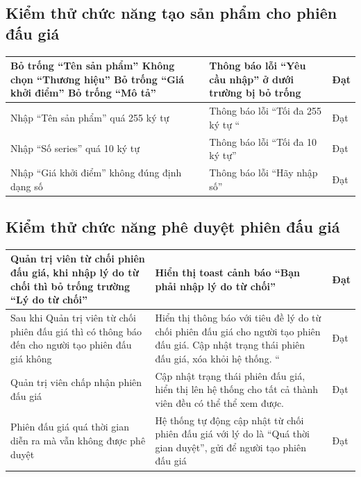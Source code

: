 \documentclass[../DoAn.tex]{subfiles}
\begin{document}
\subsection{Kiểm thử chức năng tạo sản phẩm cho phiên đấu giá}
    \tabletail{\hline}
    \label{bang414}
    \begin{supertabular}{| p{.45\textwidth}|p{.30\textwidth}|p{.15\textwidth}|} 
    \hline
        Bỏ trống “Tên sản phẩm”
        Không chọn “Thương hiệu”
        Bỏ trống “Giá khởi điểm”
        Bỏ trống “Mô tả”
        & Thông báo lỗi “Yêu cầu nhập” ở dưới trường bị bỏ trống&Đạt \\\hline
        Nhập “Tên sản phẩm” quá 255 ký tự
        & Thông báo lỗi “Tối đa 255 ký tự “&Đạt \\\hline
        Nhập “Số series” quá 10 ký tự
        & Thông báo lỗi “Tối đa 10 ký tự”&Đạt \\\hline
        Nhập “Giá khởi điểm” không đúng định dạng số
        & Thông báo lỗi “Hãy nhập số”&Đạt \\\hline
    \end{supertabular}
\subsection{Kiểm thử chức năng phê duyệt phiên đấu giá}
    \tabletail{\hline}
    \label{bang415}
    \begin{supertabular}{| p{.45\textwidth}|p{.30\textwidth}|p{.15\textwidth}|} 
    \hline
        Quản trị viên từ chối phiên đấu giá, khi nhập lý do từ chối thì bỏ trống trường “Lý do từ chối”
        & Hiển thị toast cảnh báo “Bạn phải nhập lý do từ chối”&Đạt \\\hline
        Sau khi Quản trị viên từ chối phiên đấu giá thì có thông báo đến cho người tạo phiên đấu giá không
        & Hiển thị thông báo với tiêu đề lý do từ chối phiên đấu giá cho người tạo phiên đấu giá. Cập nhật trạng thái phiên đấu giá, xóa khỏi hệ thống. “&Đạt \\\hline
        Quản trị viên chấp nhận phiên đấu giá
        & Cập nhật trạng thái phiên đấu giá, hiển thị lên hệ thống cho tất cả thành viên đều có thể thể xem được. &Đạt \\\hline
        Phiên đấu giá quá thời gian diễn ra mà vẫn không được phê duyệt
        & Hệ thống tự động cập nhật từ chối phiên đấu giá với lý do là “Quá thời gian duyệt”, gửi để người tạo phiên đấu giá&Đạt \\\hline
    \end{supertabular}
\end{document}
